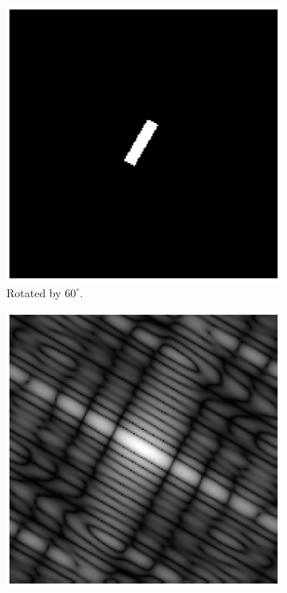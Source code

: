 \documentclass[11pt,a4paper]{article}
\begin{document}
\begin{itemize}
\begin{figure}[!ht]
		\begin{subfigure}[t]{.32\linewidth} %
		\includegraphics[width=\columnwidth]{Rotation_G_60.eps}
		\caption{\scriptsize Rotated by $60^{\circ}$.}
		\label{fig:rotated60}
		\end{subfigure}
		\begin{subfigure}[t]{.32\linewidth} %
		\includegraphics[width=\columnwidth]{Rotation_G_60_Shifted_Fourier.eps}

\end{subfigure}
\end{figure}
\end{itemize}
\end{document}
